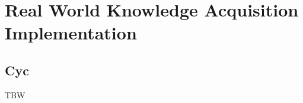 % 
\chapter{Real World Knowledge Acquisition Implementation}

\section{Cyc}
\label{section:Cyc}

TBW